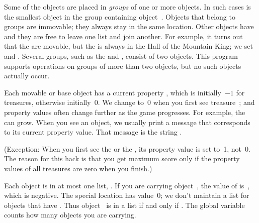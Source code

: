 Some of the objects are placed in {\it groups\/} of one or more objects.
In such cases  is the smallest object in the group containing
object~. Objects that belong to groups are immovable; they always
stay in the same location. Other objects have  and they
are free to leave one list and join another. For example, it turns
out that the  are movable, but the  is always in the
Hall of the Mountain King; we set  and .
Several groups, such as the  and , consist of two objects.
This program supports operations on groups of more than two objects,
but no such objects actually occur.

Each movable or base object  has a current property ,
which is initially~$-1$ for treasures, otherwise initially~0.
We change  to~0 when you first
see treasure~; and property values often change further as the game
progresses. For example, the  can grow. When you see an object,
we usually print a message that corresponds to its current property value.
That message is the string .

(Exception: When you first see the  or the , its property
value is set to~1, not~0. The reason for this hack is that you get
maximum score only if the property values of all treasures are
zero when you finish.)

Each object is in at most one list, .
If you are carrying object~, the value of  is~,
which is negative.
The special location  has value~0;
we don't maintain a list  for objects that have
. Thus object~ is in a list if and only if .
The global variable  counts how many objects you are carrying.

